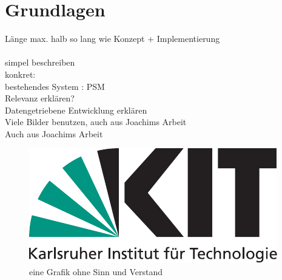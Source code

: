\chapter{Grundlagen}\label{ch:grundlagen}

Länge max. halb so lang wie Konzept + Implementierung\\
\\
simpel beschreiben\\
konkret:\\
bestehendes System : PSM\\
Relevanz erklären?\\
Datengetriebene Entwicklung erklären \\
Viele Bilder benutzen, auch aus Joachims Arbeit\\
Auch aus Joachims Arbeit \\

\begin{figure}
	\centering
	\includegraphics{bilder/Kitlogo_de_rgb.pdf}
	\caption{eine Grafik ohne Sinn und Verstand}
	\label{img:grafik-dummy}
\end{figure}

\begin{deprecated}
\cite{gehrung14}


\end{deprecated}
